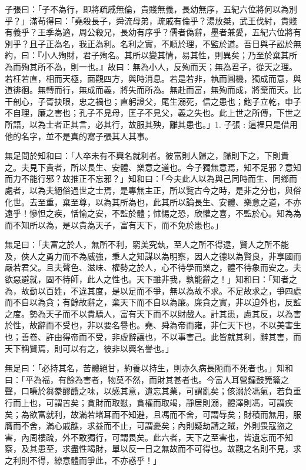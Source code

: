 \begin{pinyinscope}
子張曰：「子不為行，即將疏戚無倫，貴賤無義，長幼無序，五紀六位將何以為別乎？」滿苟得曰：「堯殺長子，舜流母弟，疏戚有倫乎？湯放桀，武王伐紂，貴賤有義乎？王季為適，周公殺兄，長幼有序乎？儒者偽辭，墨者兼愛，五紀六位將有別乎？且子正為名，我正為利。名利之實，不順於理，不監於道。吾日與子訟於無約，曰：『小人殉財，君子殉名。其所以變其情，易其性，則異矣；乃至於棄其所為而殉其所不為，則一也。』故曰：無為小人，反殉而天；無為君子，從天之理。若枉若直，相而天極，面觀四方，與時消息。若是若非，執而圓機，獨成而意，與道徘徊。無轉而行，無成而義，將失而所為。無赴而富，無殉而成，將棄而天。比干剖心，子胥抉眼，忠之禍也；直躬證父，尾生溺死，信之患也；鮑子立乾，申子不自理，廉之害也；孔子不見母，匡子不見父，義之失也。此上世之所傳，下世之所語，以為士者正其言，必其行，故服其殃，離其患也。」1. 子張 : 這裡只是借用他的名字，並不是真的寫子張其人其事。

無足問於知和曰：「人卒未有不興名就利者。彼富則人歸之，歸則下之，下則貴之。夫見下貴者，所以長生、安體、樂意之道也。今子獨無意焉，知不足邪？意知而力不能行邪？故推正不忘邪？」知和曰：「今夫此人以為與己同時而生、同鄉而處者，以為夫絕俗過世之士焉，是專無主正，所以覽古今之時，是非之分也，與俗化世。去至重，棄至尊，以為其所為也，此其所以論長生、安體、樂意之道，不亦遠乎！慘怛之疾，恬愉之安，不監於體；怵惕之恐，欣懽之喜，不監於心。知為為而不知所以為，是以貴為天子，富有天下，而不免於患也。」

無足曰：「夫富之於人，無所不利，窮美究埶，至人之所不得逮，賢人之所不能及，俠人之勇力而不為威強，秉人之知謀以為明察，因人之德以為賢良，非享國而嚴若君父。且夫聲色、滋味、權勢之於人，心不待學而樂之，體不待象而安之。夫欲惡避就，固不待師，此人之性也。天下雖非我，孰能辭之！」知和曰：「知者之為，故動以百姓，不違其度，是以足而不爭，無以為故不求。不足故求之，爭四處而不自以為貪；有餘故辭之，棄天下而不自以為廉。廉貪之實，非以迫外也，反監之度。勢為天子而不以貴驕人，富有天下而不以財戲人。計其患，慮其反，以為害於性，故辭而不受也，非以要名譽也。堯、舜為帝而雍，非仁天下也，不以美害生也；善卷、許由得帝而不受，非虛辭讓也，不以事害己。此皆就其利，辭其害，而天下稱賢焉，則可以有之，彼非以興名譽也。」

無足曰：「必持其名，苦體絕甘，約養以持生，則亦久病長阨而不死者也。」知和曰：「平為福，有餘為害者，物莫不然，而財其甚者也。今富人耳營鐘鼓筦籥之聲，口嗛於芻豢醪醴之味，以感其意，遺忘其業，可謂亂矣；侅溺於馮氣，若負重行而上也，可謂苦矣；貪財而取慰，貪權而取竭，靜居則溺，體澤則馮，可謂疾矣；為欲富就利，故滿若堵耳而不知避，且馮而不舍，可謂辱矣；財積而無用，服膺而不舍，滿心戚醮，求益而不止，可謂憂矣；內則疑劫請之賊，外則畏寇盜之害，內周樓疏，外不敢獨行，可謂畏矣。此六者，天下之至害也，皆遺忘而不知察，及其患至，求盡性竭財，單以反一日之無故而不可得也。故觀之名則不見，求之利則不得，繚意體而爭此，不亦惑乎！」


\end{pinyinscope}